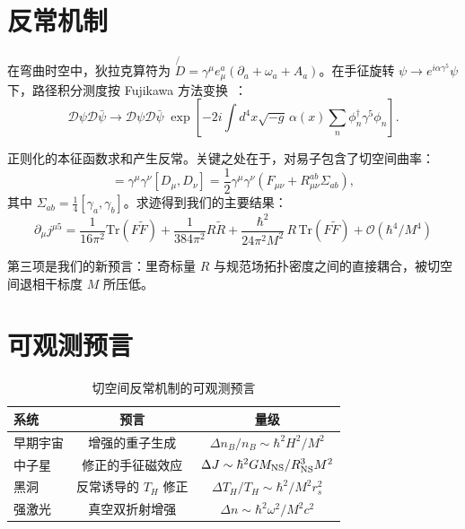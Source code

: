 \documentclass{article}
\begin{document}
\section{反常机制}

在弯曲时空中，狄拉克算符为 $\not{D} = \gamma^\mu e^a_\mu (\partial_a + \omega_a + A_a)$。在手征旋转 $\psi \to e^{i\alpha\gamma^5}\psi$ 下，路径积分测度按 Fujikawa 方法变换~\cite{fujikawa1979}：
\begin{equation}
\mathcal{D}\psi\mathcal{D}\bar{\psi} \to \mathcal{D}\psi\mathcal{D}\bar{\psi} \;
\exp\left[-2i\int d^4x\sqrt{-g}\,\alpha(x)\sum_n \phi_n^\dagger\gamma^5\phi_n\right].
\label{eq:measure}
\end{equation}

正则化的本征函数求和产生反常。关键之处在于，对易子包含了切空间曲率：
\begin{equation}
[\not{D}, \not{D}] = \gamma^\mu\gamma^\nu [D_\mu, D_\nu] 
= \frac{1}{2}\gamma^\mu\gamma^\nu (F_{\mu\nu} + R^{ab}_{\mu\nu}\Sigma_{ab}),
\label{eq:commutator}
\end{equation}
其中 $\Sigma_{ab} = \frac{1}{4}[\gamma_a, \gamma_b]$。求迹得到我们的主要结果：
\begin{equation}
\boxed{
\partial_\mu j^{\mu 5} = \frac{1}{16\pi^2} \text{Tr}(F\tilde{F})
+ \frac{1}{384\pi^2} R\tilde{R}
+ \frac{\hbar^2}{24\pi^2 M^2}\, R\,\text{Tr}(F\tilde{F}) + \mathcal{O}(\hbar^4/M^4)
}
\label{eq:main}
\end{equation}

第三项是我们的新预言：里奇标量 $R$ 与规范场拓扑密度之间的直接耦合，被切空间退相干标度 $M$ 所压低。

\section{可观测预言}

\begin{table}[h]
\centering
\caption{切空间反常机制的可观测预言}
\begin{tabular}{|l|c|c|}
\hline
\textbf{系统} & \textbf{预言} & \textbf{量级} \\
\hline
早期宇宙 & 增强的重子生成 & $\Delta n_B/n_B \sim \hbar^2 H^2/M^2$ \\
中子星 & 修正的手征磁效应 & $\Delta J \sim \hbar^2 G M_{\rm NS}/R_{\rm NS}^3 M^2$ \\
黑洞 & 反常诱导的 $T_H$ 修正 & $\Delta T_H/T_H \sim \hbar^2/M^2 r_s^2$ \\
强激光 & 真空双折射增强 & $\Delta n \sim \hbar^2 \omega^2/M^2 c^2$ \\
\hline
\end{tabular}
\label{tab:predictions}
\end{table}
\end{document}
